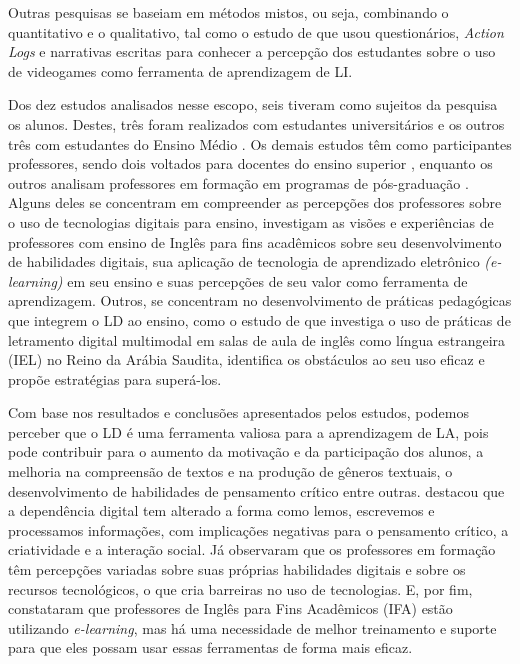 Outras pesquisas se baseiam em métodos mistos, ou seja, combinando o
quantitativo e o qualitativo, tal como o estudo de \textcite{valadares2021videogames} que usou questionários, \emph{Action Logs} e narrativas escritas
para conhecer a percepção dos estudantes sobre o uso de videogames como
ferramenta de aprendizagem de LI.

Dos dez estudos analisados nesse escopo, seis tiveram como sujeitos da
pesquisa os alunos. Destes, três foram realizados com estudantes
universitários \cite{roche2017assessing,bozavli2021foreign,valadares2021videogames} e
os outros três com estudantes do Ensino Médio \cite{oliveira2018multiletramentos,xavier2019construcao,cladis2020shifting}. Os demais estudos têm
como participantes professores, sendo dois voltados para docentes do
ensino superior \cite{dhillon2021investigation,almusharraf2020postsecondary},
enquanto os outros analisam professores em formação em programas de
pós-graduação \cite{krajka2021,campbell2020developing}. Alguns deles se
concentram em compreender as percepções dos professores sobre o uso de
tecnologias digitais para ensino, \textcite{dhillon2021investigation} investigam as
visões e experiências de professores com ensino de Inglês para fins
acadêmicos sobre seu desenvolvimento de habilidades digitais, sua
aplicação de tecnologia de aprendizado eletrônico \emph{(e-learning)} em
seu ensino e suas percepções de seu valor como ferramenta de
aprendizagem. Outros, se concentram no desenvolvimento de práticas
pedagógicas que integrem o LD ao ensino, como o estudo de \textcite{almusharraf2020postsecondary} que investiga o uso de práticas de letramento digital
multimodal em salas de aula de inglês como língua estrangeira (IEL) no
Reino da Arábia Saudita, identifica os obstáculos ao seu uso eficaz e
propõe estratégias para superá-los.

Com base nos resultados e conclusões apresentados pelos
estudos, podemos perceber que o LD é uma ferramenta valiosa
para a aprendizagem de LA, pois pode contribuir para o aumento da
motivação e da participação dos alunos, a melhoria na compreensão de
textos e na produção de gêneros textuais, o desenvolvimento de
habilidades de pensamento crítico entre outras. \textcite{cladis2020shifting} destacou
que a dependência digital tem alterado a forma como lemos, escrevemos e
processamos informações, com implicações negativas para o pensamento
crítico, a criatividade e a interação social. Já \textcite{campbell2020developing}
observaram que os professores em formação têm percepções variadas sobre
suas próprias habilidades digitais e sobre os recursos tecnológicos, o
que cria barreiras no uso de tecnologias. E, por fim, \textcite{dhillon2021investigation} constataram que professores de Inglês para Fins Acadêmicos (IFA)
estão utilizando \emph{e-learning}, mas há uma necessidade de melhor
treinamento e suporte para que eles possam usar essas ferramentas de
forma mais eficaz.

